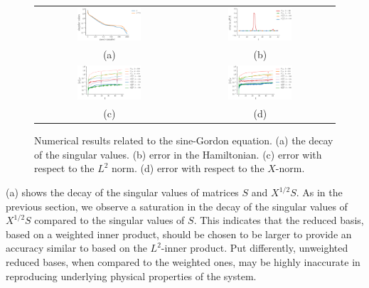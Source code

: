 \begin{figure} \label{fig:2}
\begin{tabular}{cc}
\includegraphics[width=0.45\textwidth]{./figs/sine/singulars} & \includegraphics[width=0.45\textwidth]{./figs/sine/energy} \\
(a) & (b) \\
\includegraphics[width=0.45\textwidth]{./figs/sine/l2} & \includegraphics[width=0.45\textwidth]{./figs/sine/energy_norm} \\
(c) & (d) \\
\end{tabular}
\caption{Numerical results related to the sine-Gordon equation. (a) the decay of the singular values. (b) error in the Hamiltonian. (c) error with respect to the $L^2$ norm. (d) error with respect to the $X$-norm.}
\end{figure}

(a) shows the decay of the singular values of matrices $S$ and $X^{1/2}S$. As in the previous section, we observe a saturation in the decay of the singular values of $X^{1/2}S$ compared to the singular values of $S$. This indicates that the reduced basis, based on a weighted inner product, should be chosen to be larger to provide an accuracy similar to based on the $L^2$-inner product. Put differently, unweighted reduced bases, when compared to the weighted ones, may be highly inaccurate in reproducing underlying physical properties of the system.

